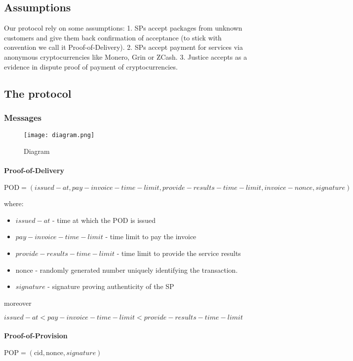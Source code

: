 \documentclass{article}
\begin{document}
\subsection{Assumptions}
Our protocol rely on some assumptions:
1. SPs accept packages from unknown customers and give them back confirmation of acceptance (to stick with convention we call it Proof-of-Delivery).
2. SPs accept payment for services via anonymous cryptocurrencies like Monero, Grin or ZCash. 
3. Justice accepts as a evidence in dispute proof of payment of cryptocurrencies. 

\subsection{The protocol}
\subsubsection{Messages}

\begin{figure}[h!]
    \centering
    \texttt{[image: diagram.png]}
    \caption{Diagram}
    \label{fig:diagram}
\end{figure}

\paragraph{Proof-of-Delivery}
$\mathrm{POD} = (issued-at, pay-invoice-time-limit, provide-results-time-limit, invoice-nonce, signature)$

where:
\begin{itemize}
    \item $issued-at$ - time at which the POD is issued
    \item $pay-invoice-time-limit$ - time limit to pay the invoice 
    \item $provide-results-time-limit$ - time limit to provide the service results
    \item $\mathrm{nonce}$ - randomly generated number uniquely identifying the transaction.
    \item $signature$ - signature proving authenticity of the SP
\end{itemize}
moreover

$issued-at < pay-invoice-time-limit < provide-results-time-limit$

\paragraph{Proof-of-Provision}
$\mathrm{POP} = (\mathrm{cid}, \mathrm{nonce}, signature)$
\end{document}
